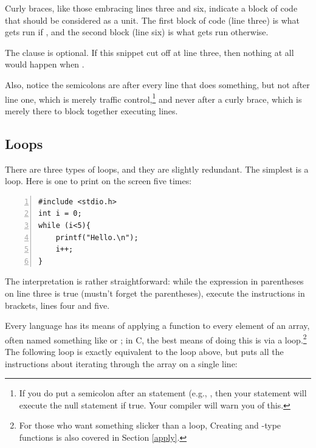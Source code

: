 Curly braces, like those embracing lines three and six, indicate a block of
code that should be considered as a unit. The first block of code (line
three) is what gets run if , and the second block (line six)
is what gets run otherwise.

The  clause is optional. If this snippet cut off at line three,
then nothing at all would happen when .

Also, notice the semicolons are after every line that does something,
but not after line one, which is merely traffic control,\footnote{If you
do put a semicolon after an  statement (e.g., ,
then your  statement will execute the null statement  if true. Your compiler will warn you of this.} and never
after a curly brace, which is merely there to block together executing
lines.


\subsection{Loops} There are three types of loops, and they are slightly
redundant. The simplest is a  loop. Here is one to print 
on the screen five times: 

 
\begin{lstlisting}[numbers=left, numberstyle=\scshape]
#include <stdio.h>
int i = 0;
while (i<5){
    printf("Hello.\n");
    i++;
}
\end{lstlisting}

The interpretation is rather straightforward: while the expression
in parentheses on line three is true (mustn't forget the parentheses), execute the
instructions in brackets, lines four and five.

Every language has its means of applying a function to every element
of an array, often named something like  or ;
in C, the best means of doing this is via a 
loop.\footnote{For those who want something slicker than a 
loop, Creating  and -type functions is also
covered in Section \ref{apply}.} The following  loop is exactly
equivalent to the  loop above, but puts all the instructions
about iterating through the array on a single line:

